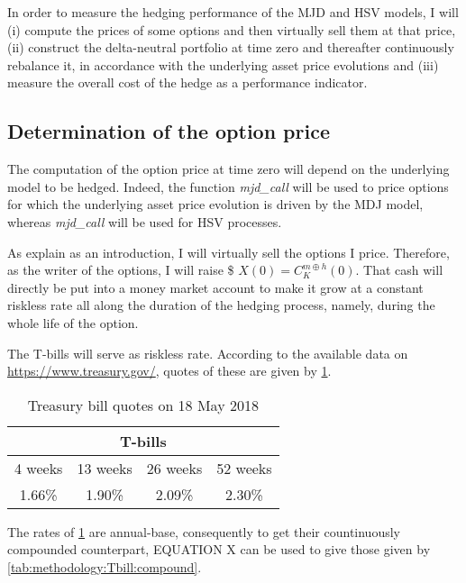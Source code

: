 \documentclass[12pt]{report}
\begin{document}
In order to measure the hedging performance of the MJD and HSV models, I will (i) compute the prices of some options and then virtually sell them at that price, (ii)  construct the delta-neutral portfolio at time zero and thereafter continuously rebalance it, in accordance with the underlying asset price evolutions and (iii) measure the overall cost of the hedge as a performance indicator.




\subsection{Determination of the option price}
\label{sec:methodology:determination}

The computation of the option price at time zero will depend on the underlying model to be hedged.
Indeed, the function \textit{mjd\_call} will be used to price options for which the underlying asset price evolution is driven by the MDJ model, whereas \textit{mjd\_call} will be used for HSV processes.

As explain as an introduction, I will virtually sell the options I price.
Therefore, as the writer of the options, I will raise \$ $X(0) = C_K^{m \oplus h} (0)$.
That cash will directly be put into a money market account to make it grow at a constant riskless rate all along the duration of the hedging process, namely, during the whole life of the option.

The T-bills will serve as riskless rate. According to the available data on \url{https://www.treasury.gov/}, quotes of these are given by \cref{tab:methodology:Tbill}.

\begin{table}[h]
\centering
\begin{tabular}{cccc}
  \hline
  \multicolumn{4}{c}{T-bills} \\
  \hline
  4 weeks & 13 weeks & 26 weeks & 52 weeks \\
  1.66\% & 1.90\% & 2.09\% & 2.30\% \\
  \hline
\end{tabular}
\caption{Treasury bill quotes on 18 May 2018} 
\label{tab:methodology:Tbill}
\end{table}

The rates of \cref{tab:methodology:Tbill} are annual-base, consequently to get their countinuously compounded counterpart, EQUATION X can be used to give those given by \cref{tab:methodology:Tbill:compound}.
\end{document}

